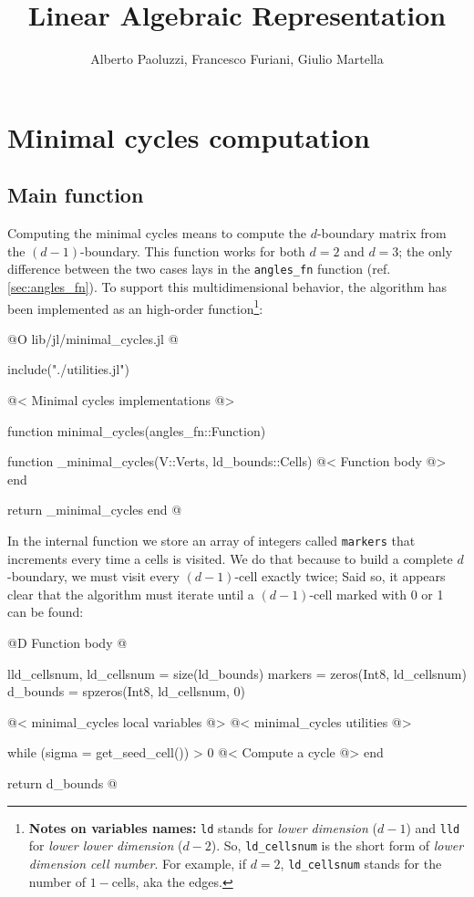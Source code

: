 \documentclass[10pt]{book}
\author{Alberto Paoluzzi, Francesco Furiani, Giulio Martella}
\title{Linear Algebraic Representation}
\begin{document}
\frontmatter
\maketitle
\tableofcontents





\mainmatter

\chapter{Minimal cycles computation}
\label{ch:minimal_cycles}

\section{Main function}


Computing the minimal cycles means to compute the $d$-boundary matrix
from the $(d-1)$-boundary. This function works for both $d=2$ and $d=3$;
the only difference between the two cases lays in the \texttt{angles\_fn}
function (ref. \ref{sec:angles_fn}). To support this multidimensional
behavior, the algorithm has been implemented as an high-order function\footnote{
    \textbf{Notes on variables names:} \texttt{ld} stands for \textit{lower dimension} ($d-1$)
    and \texttt{lld} for \textit{lower lower dimension} ($d-2$). So, \texttt{ld\_cellsnum} is the
    short form of \textit{lower dimension cell number}. For example, if $d=2$, \texttt{ld\_cellsnum} stands for the
    number of $1-$cells, aka the edges.
}:

@O lib/jl/minimal_cycles.jl
@{include("./utilities.jl")

@< Minimal cycles implementations @>

function minimal_cycles(angles_fn::Function)

    function _minimal_cycles(V::Verts, ld_bounds::Cells)
        @< Function body @>
    end

    return _minimal_cycles
end
@}

In the internal function we store an array of integers called \texttt{markers} 
that increments every time a cells is visited. We do that because to build 
a complete $d$-boundary, we must visit every $(d-1)$-cell exactly twice;
Said so, it appears clear that the algorithm must iterate until a $(d-1)$-cell 
marked with 0 or 1 can be found:

@D Function body
@{lld_cellsnum, ld_cellsnum = size(ld_bounds)
markers = zeros(Int8, ld_cellsnum)
d_bounds = spzeros(Int8, ld_cellsnum, 0)

@< minimal\_cycles local variables @>
@< minimal\_cycles utilities @>

while (sigma = get_seed_cell()) > 0
    @< Compute a cycle @>
end

return d_bounds
@}
\end{document}

